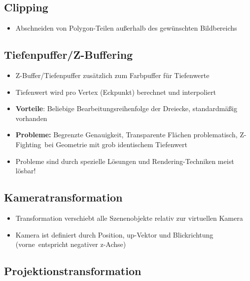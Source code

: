 \subsection{Clipping}%
\label{rp:sub:clipping}

\begin{itemize}
	\item Abschneiden von Polygon-Teilen außerhalb des gewünschten Bildbereichs
\end{itemize}

\subsection{Tiefenpuffer/Z-Buffering}%
\label{rp:sub:tiefenpuffer_z_buffering}

\begin{itemize}
	\item Z-Buffer/Tiefenpuffer zusätzlich zum Farbpuffer für Tiefenwerte
	\item Tiefenwert wird pro Vertex (Eckpunkt) berechnet und interpoliert
	\item \textbf{Vorteile}: Beliebige Bearbeitungsreihenfolge der Dreiecke, standardmäßig vorhanden
	\item \textbf{Probleme:} Begrenzte Genauigkeit, Transparente Flächen problematisch, \glqq Z-Fighting\grqq\ bei Geometrie mit grob identischem Tiefenwert
	\item Probleme sind durch spezielle Lösungen und Rendering-Techniken meist lösbar!
\end{itemize}

\subsection{Kameratransformation}%
\label{rp:sub:kameratransformation}

\begin{itemize}
	\item Transformation verschiebt alle Szenenobjekte relativ zur virtuellen Kamera
	\item Kamera ist definiert durch Position, up-Vektor und Blickrichtung (\glqq vorne\grqq\ entspricht negativer z-Achse)
\end{itemize}

\subsection{Projektionstransformation}%
\label{rp:sub:projektionstransformation}

